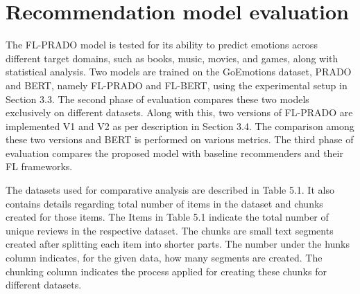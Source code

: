 \section{Recommendation model evaluation}
The FL-PRADO model is tested for its ability to predict emotions across different target domains, such as books, music, movies, and games, along with statistical analysis. Two models are trained on the GoEmotions dataset, PRADO and BERT, namely FL-PRADO and FL-BERT, using the experimental setup in Section 3.3. The second phase of evaluation compares these two models exclusively on different datasets. Along with this, two versions of FL-PRADO are implemented V1 and V2 as per description in Section 3.4. The comparison among these two versions and BERT is performed on various metrics.  The third phase of evaluation compares the proposed model with baseline recommenders and their FL frameworks.

The datasets used for comparative analysis are described in Table 5.1. It also contains details regarding total number of items in the dataset and chunks created for those items. The Items in Table 5.1 indicate the total number of unique reviews in the respective dataset. The chunks are small text segments created after splitting each item into shorter parts. The number under the hunks column indicates, for the given data, how many segments are created. The chunking column indicates the process applied for creating these chunks for different datasets.

